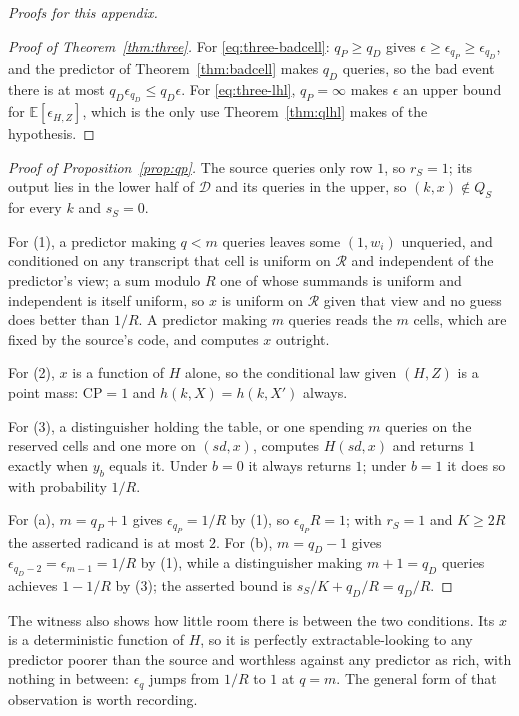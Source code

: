 \documentclass{aicr-solution}
\newcommand{\sd}{\mathit{sd}}
\newcommand{\calD}{\mathcal{D}}
\newcommand{\calR}{\mathcal{R}}
\newcommand{\CP}{\mathrm{CP}}
\begin{document}
\medskip\noindent\emph{Proofs for this appendix.}

\begin{proof}[Proof of Theorem~\ref{thm:three}]
For \eqref{eq:three-badcell}: $q_P \ge q_D$ gives $\epsilon \ge \epsilon_{q_P} \ge \epsilon_{q_D}$,
and the predictor of Theorem~\ref{thm:badcell} makes $q_D$ queries, so the bad event there is at
most $q_D\epsilon_{q_D} \le q_D\epsilon$. For \eqref{eq:three-lhl}, $q_P = \infty$ makes $\epsilon$
an upper bound for $\mathbb{E}[\epsilon_{H,Z}]$, which is the only use Theorem~\ref{thm:qlhl} makes
of the hypothesis.
\end{proof}
\begin{proof}[Proof of Proposition~\ref{prop:qp}]
The source queries only row $1$, so $r_S = 1$; its output lies in the lower half of $\calD$ and its
queries in the upper, so $(k,x) \notin Q_S$ for every $k$ and $s_S = 0$.

For (1), a predictor making $q < m$ queries leaves some $(1,w_i)$ unqueried, and conditioned on any
transcript that cell is uniform on $\calR$ and independent of the predictor's view; a sum modulo $R$
one of whose summands is uniform and independent is itself uniform, so $x$ is uniform on $\calR$
given that view and no guess does better than $1/R$. A predictor making $m$ queries reads the $m$
cells, which are fixed by the source's code, and computes $x$ outright.

For (2), $x$ is a function of $H$ alone, so the conditional law given $(H,Z)$ is a point mass:
$\CP = 1$ and $h(k,X) = h(k,X')$ always.

For (3), a distinguisher holding the table, or one spending $m$ queries on the reserved cells and
one more on $(\sd, x)$, computes $H(\sd,x)$ and returns $1$ exactly when $y_b$ equals it. Under
$b = 0$ it always returns $1$; under $b = 1$ it does so with probability $1/R$.

For (a), $m = q_P+1$ gives $\epsilon_{q_P} = 1/R$ by (1), so $\epsilon_{q_P}R = 1$; with $r_S = 1$
and $K \ge 2R$ the asserted radicand is at most $2$. For (b), $m = q_D - 1$ gives
$\epsilon_{q_D-2} = \epsilon_{m-1} = 1/R$ by (1), while a distinguisher making $m+1 = q_D$ queries
achieves $1 - 1/R$ by (3); the asserted bound is $s_S/K + q_D/R = q_D/R$.
\end{proof}

The witness also shows how little room there is between the two conditions. Its $x$ is a
deterministic function of $H$, so it is perfectly extractable-looking to any predictor poorer than
the source and worthless against any predictor as rich, with nothing in between: $\epsilon_q$ jumps
from $1/R$ to $1$ at $q = m$. The general form of that observation is worth recording.
\end{document}
